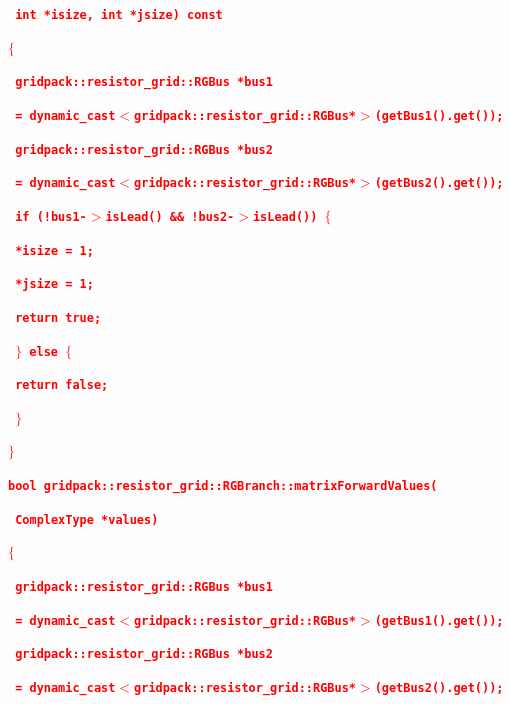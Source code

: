 \documentclass[12pt]{report} %
\begin{document}
\textcolor{red}{\texttt{\textbf{   int *isize, int *jsize) const}}}

\textcolor{red}{\texttt{\textbf{$\boldsymbol{\mathrm{\{}}$}}}

\textcolor{red}{\texttt{\textbf{  gridpack::resistor\_grid::RGBus *bus1}}}

\textcolor{red}{\texttt{\textbf{    = dynamic\_cast$\boldsymbol{\mathrm{<}}$gridpack::resistor\_grid::RGBus*$\boldsymbol{\mathrm{>}}$(getBus1().get());}}}

\textcolor{red}{\texttt{\textbf{  gridpack::resistor\_grid::RGBus *bus2}}}

\textcolor{red}{\texttt{\textbf{    = dynamic\_cast$\boldsymbol{\mathrm{<}}$gridpack::resistor\_grid::RGBus*$\boldsymbol{\mathrm{>}}$(getBus2().get());}}}

\textcolor{red}{\texttt{\textbf{  if (!bus1-$\boldsymbol{\mathrm{>}}$isLead() \&\& !bus2-$\boldsymbol{\mathrm{>}}$isLead()) $\boldsymbol{\mathrm{\{}}$}}}

\textcolor{red}{\texttt{\textbf{    *isize = 1;}}}

\textcolor{red}{\texttt{\textbf{    *jsize = 1;}}}

\textcolor{red}{\texttt{\textbf{    return true;}}}

\textcolor{red}{\texttt{\textbf{  $\boldsymbol{\mathrm{\}}}$ else $\boldsymbol{\mathrm{\{}}$ }}}

\textcolor{red}{\texttt{\textbf{    return false;}}}

\textcolor{red}{\texttt{\textbf{  $\boldsymbol{\mathrm{\}}}$}}}

\textcolor{red}{\texttt{\textbf{$\boldsymbol{\mathrm{\}}}$}}}

\textcolor{red}{\texttt{\textbf{bool gridpack::resistor\_grid::RGBranch::matrixForwardValues(}}}

\textcolor{red}{\texttt{\textbf{   ComplexType *values)}}}

\textcolor{red}{\texttt{\textbf{$\boldsymbol{\mathrm{\{}}$}}}

\textcolor{red}{\texttt{\textbf{  gridpack::resistor\_grid::RGBus *bus1}}}

\textcolor{red}{\texttt{\textbf{    = dynamic\_cast$\boldsymbol{\mathrm{<}}$gridpack::resistor\_grid::RGBus*$\boldsymbol{\mathrm{>}}$(getBus1().get());}}}

\textcolor{red}{\texttt{\textbf{  gridpack::resistor\_grid::RGBus *bus2}}}

\textcolor{red}{\texttt{\textbf{    = dynamic\_cast$\boldsymbol{\mathrm{<}}$gridpack::resistor\_grid::RGBus*$\boldsymbol{\mathrm{>}}$(getBus2().get());}}}
\end{document}
